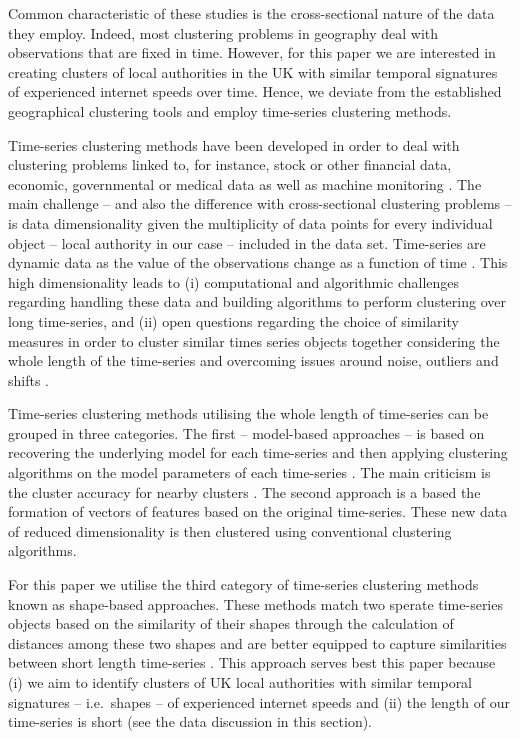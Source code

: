 \documentclass[]{interact}
\theoremstyle{plain}%
\theoremstyle{definition}
\theoremstyle{remark}
\begin{document}
Common characteristic of these studies is the cross-sectional nature of
the data they employ. Indeed, most clustering problems in geography deal
with observations that are fixed in time. However, for this paper we are
interested in creating clusters of local authorities in the UK with
similar temporal signatures of experienced internet speeds over time.
Hence, we deviate from the established geographical clustering tools and
employ time-series clustering methods.

Time-series clustering methods have been developed in order to deal with
clustering problems linked to, for instance, stock or other financial
data, economic, governmental or medical data as well as machine
monitoring
\citep{aggarwal2013time, aggarwal2001surprising, hyndman2015large, WARRENLIAO20051857}.
The main challenge -- and also the difference with cross-sectional
clustering problems -- is data dimensionality given the multiplicity of
data points for every individual object -- local authority in our case
-- included in the data set. Time-series are dynamic data as the value
of the observations change as a function of time
\citep{aghabozorgi2015time}. This high dimensionality leads to (i)
computational and algorithmic challenges regarding handling these data
and building algorithms to perform clustering over long time-series, and
(ii) open questions regarding the choice of similarity measures in order
to cluster similar times series objects together considering the whole
length of the time-series and overcoming issues around noise, outliers
and shifts \citep{lin2004iterative, aghabozorgi2015time}.

Time-series clustering methods utilising the whole length of time-series
can be grouped in three categories. The first -- model-based approaches
-- is based on recovering the underlying model for each time-series and
then applying clustering algorithms on the model parameters of each
time-series \citep{aghabozorgi2015time}. The main criticism is the
cluster accuracy for nearby clusters \citep{mitsa2010temporal}. The
second approach is a based the formation of vectors of features based on
the original time-series. These new data of reduced dimensionality is
then clustered using conventional clustering algorithms.

For this paper we utilise the third category of time-series clustering
methods known as shape-based approaches. These methods match two sperate
time-series objects based on the similarity of their shapes through the
calculation of distances among these two shapes and are better equipped
to capture similarities between short length time-series
\citep{aghabozorgi2015time}. This approach serves best this paper
because (i) we aim to identify clusters of UK local authorities with
similar temporal signatures -- i.e.~shapes -- of experienced internet
speeds and (ii) the length of our time-series is short (see the data
discussion in this section).
\end{document}
